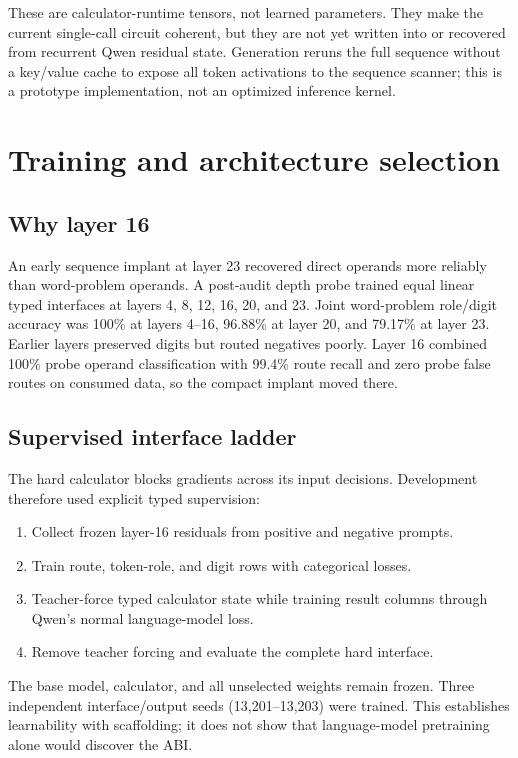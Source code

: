 \documentclass[11pt]{article}
\begin{document}
These are calculator-runtime tensors, not learned parameters. They make the
current single-call circuit coherent, but they are not yet written into or
recovered from recurrent Qwen residual state. Generation reruns the full
sequence without a key/value cache to expose all token activations to the
sequence scanner; this is a prototype implementation, not an optimized
inference kernel.

\section{Training and architecture selection}

\subsection{Why layer 16}

An early sequence implant at layer 23 recovered direct operands more reliably
than word-problem operands. A post-audit depth probe trained equal linear typed
interfaces at layers 4, 8, 12, 16, 20, and 23. Joint word-problem role/digit
accuracy was 100\% at layers 4--16, 96.88\% at layer 20, and 79.17\% at layer
23. Earlier layers preserved digits but routed negatives poorly. Layer 16
combined 100\% probe operand classification with 99.4\% route recall and zero
probe false routes on consumed data, so the compact implant moved there.

\subsection{Supervised interface ladder}

The hard calculator blocks gradients across its input decisions. Development
therefore used explicit typed supervision:

\begin{enumerate}
\item Collect frozen layer-16 residuals from positive and negative prompts.
\item Train route, token-role, and digit rows with categorical losses.
\item Teacher-force typed calculator state while training result columns
      through Qwen's normal language-model loss.
\item Remove teacher forcing and evaluate the complete hard interface.
\end{enumerate}

The base model, calculator, and all unselected weights remain frozen. Three
independent interface/output seeds (13,201--13,203) were trained. This
establishes learnability with scaffolding; it does not show that language-model
pretraining alone would discover the ABI.
\end{document}
